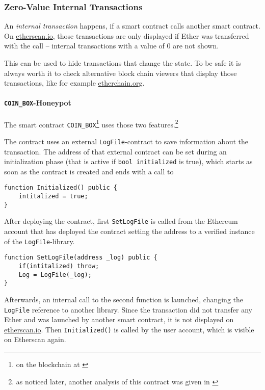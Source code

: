 \subsubsection{Zero-Value Internal Transactions}
An \textit{internal transaction} happens, if a smart contract calls another smart contract. On \url{etherscan.io}, those transactions are only displayed if Ether was transferred with the call -- internal transactions with a value of \( 0 \) are not shown.

This can be used to hide transactions that change the state. To be safe it is always worth it to check alternative block chain viewers that display those transactions, like for example \url{etherchain.org}.

\paragraph{\texttt{COIN_BOX}-Honeypot}
\label{section:honeypot:library}
The smart contract \texttt{COIN_BOX}\footnote{on the blockchain at \cite{etherscan:coinbox}} uses those two features.\footnote{as noticed later, another analysis of this contract was given in \cite{alexsherbuck:dissectinghoneypot}}

The contract uses an external \texttt{LogFile}-contract to save information about the transaction. The address of that external contract can be set during an initialization phase (that is active if \texttt{bool initialized} is true), which starts as soon as the contract is created and ends with a call to
\begin{verbatim}
function Initialized() public {
    intitalized = true;
}
\end{verbatim}

After deploying the contract, first \texttt{SetLogFile} is called from the Ethereum account that has deployed the contract setting the address to a verified instance of the \texttt{LogFile}-library.
\begin{verbatim}
function SetLogFile(address _log) public {
    if(intitalized) throw;
    Log = LogFile(_log);
}
\end{verbatim}

Afterwards, an internal call to the second function is launched, changing the \texttt{LogFile} reference to another library. Since the transaction did not transfer any Ether and was launched by another smart contract, it is not displayed on \url{etherscan.io}. Then \texttt{Initialized()} is called by the user account, which is visible on Etherscan again.

